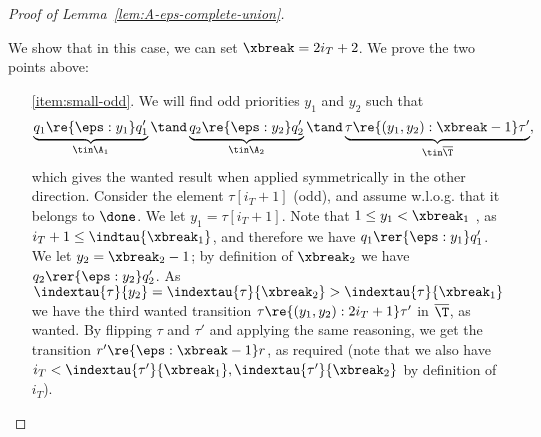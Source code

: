 \begin{proof}[Proof of Lemma~\ref{lem:A-eps-complete-union}]
\begin{description}
        We show that in this case, we can set $\xbreak=2i_T+2$. We prove the two points above:
        \begin{itemize}
            \item[\ref{item:small-odd}.] We will find odd priorities $y_{1}$ and $y_{2}$ such that
            \[
            \underbrace{q_{1} \re{\eps:y_{1}} q'_{1}}_{\tin \A_{1}}\tand  \underbrace{q_{2} \re{\eps:y_{2}} q'_{2}}_{\tin \A_{2}} \tand \underbrace{\tau \re{(y_{1}, y_{2}):\xbreak-1} \tau'}_{\tin \overline \T},
            \]
            which gives the wanted result when applied symmetrically in the other direction.
            Consider the element $\tau[i_T+1]$ (odd), and assume w.l.o.g. that it belongs to $\done$. We let $y_1 = \tau[i_T+1]$.
            Note that $1\leq y_1< \xbreak_1$ , as $i_T+1\leq \indtau{\xbreak_1}$, and therefore we have $q_1 \rer{\eps:y_1} q'_1$. 
            We let $y_2 = \xbreak_2 - 1$;
            by definition of $\xbreak_2$ we have $q_2 \rer{\eps:y_2} q'_2$.
            As $\indextau{\tau}{y_2} = \indextau{\tau}{\xbreak_2} > \indextau{\tau}{\xbreak_1} $ we have the third wanted transition $\tau \re{(y_1,y_2):2i_T + 1} \tau'$ in $\overline \T$, as wanted.
            By flipping $\tau$ and $\tau'$ and applying the same reasoning, we get the transition $r' \re{\eps:\xbreak-1} r$, as required (note that we also have $i_T < \indextau{\tau'}{\xbreak_1}, \indextau{\tau'}{\xbreak_2}$ by definition of $i_T$).
            

\end{itemize}
\end{description}
\end{proof}

